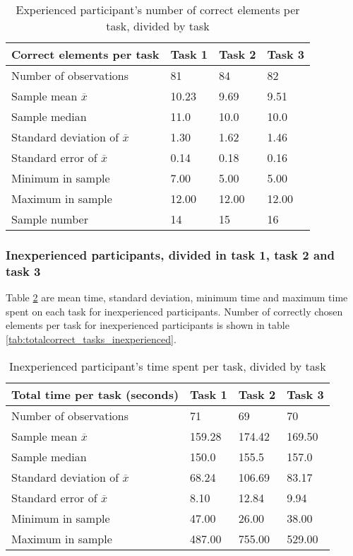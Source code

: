 \begin{table}[H]
	\centering
	\begin{tabular}{l|l|l|l}
		Correct elements per task & Task 1 & Task 2 & Task 3 \\ \hline
		Number of observations & 81    & 84      & 82   \\
		Sample mean $\overline{x}$ & 10.23  &  9.69  &  9.51   \\
		Sample median & 11.0  &  10.0  &  10.0  \\
		Standard deviation of $\overline{x}$ & 1.30  & 1.62  & 1.46   \\
		Standard error of $\overline{x}$ & 0.14  & 0.18  & 0.16   \\
		Minimum in sample & 7.00 & 5.00 &  5.00 \\
		Maximum in sample  & 12.00 & 12.00  & 12.00 \\ \hline
		Sample number & 14 & 15  & 16   \\
	\end{tabular}
	\caption[Correct elements, task and experienved divided]{Experienced participant's number of correct elements per task, divided by task}
	\label{tab:totalcorrect_tasks_experienced}
\end{table}

\subsubsection{Inexperienced participants, divided in task 1, task 2 and task 3}\label{sec:taskdivided_inexperienced}

Table \ref{tab:totaltime_tasks_inexperienced} are mean time, standard deviation, minimum time and maximum time spent on each task for inexperienced participants. Number of correctly chosen elements per task for inexperienced participants is shown in table \ref{tab:totalcorrect_tasks_inexperienced}. 

\begin{table}[H]
	\centering
	\begin{tabular}{l|l|l|l}
		Total time per task (seconds) & Task 1 & Task 2 & Task 3 \\ \hline
		Number of observations & 71    & 69  & 70   \\
		Sample mean $\overline{x}$  & 159.28  &  174.42  &  169.50  \\
		Sample median & 150.0  &  155.5  &  157.0  \\
		Standard deviation of $\overline{x}$  & 68.24  & 106.69  & 83.17   \\
		Standard error of $\overline{x}$  & 8.10  & 12.84  & 9.94   \\
		Minimum in sample & 47.00 & 26.00 &  38.00 \\
		Maximum in sample & 487.00 & 755.00  & 529.00  \\ \hline
	\end{tabular}
	\caption[Total time, inexperienced per task]{Inexperienced participant's time spent per task, divided by task}
	\label{tab:totaltime_tasks_inexperienced}
\end{table}

